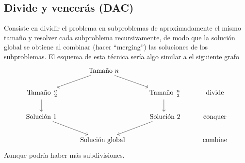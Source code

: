 \documentclass[AL.tex]{subfiles}
\begin{document}
\subsection{Divide y vencerás (DAC)}
Consiste en dividir el problema en subproblemas de aproximadamente el mismo tamaño y resolver cada subproblema recursivamente, de modo que la solución global se obtiene al combinar (hacer ``merging'') las soluciones de los subproblemas. El esquema de esta técnica sería algo similar a el siguiente grafo
\[
\begin{tikzcd}
  & \text{ Tamaño } n\arrow[dl]\arrow[dr] & & \\
\text{ Tamaño }\frac{n}{2}\arrow[d] & & \text{ Tamaño }\frac{n}{2}\arrow[d]& \text{divide}\\
\text{Solución }1 \arrow[dr] & & \text{ Solución }2\arrow[dl] & \text{conquer}\\
                             & \text{Solución global} &     & \text{combine}
\end{tikzcd}
\]
Aunque podría haber más subdivisiones.
\end{document}
